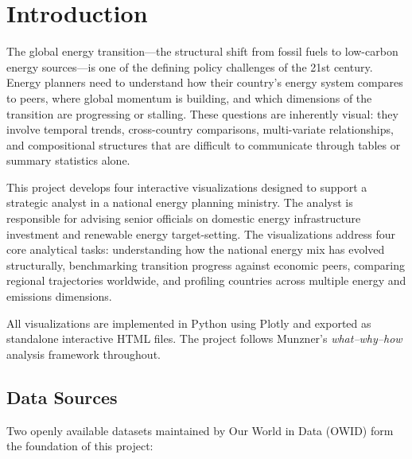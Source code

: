 \documentclass[10pt]{article}
\begin{document}
\section{Introduction}
\label{sec:intro}

The global energy transition---the structural shift from fossil fuels to low-carbon energy sources---is one of the defining policy challenges of the 21st century. Energy planners need to understand how their country's energy system compares to peers, where global momentum is building, and which dimensions of the transition are progressing or stalling. These questions are inherently visual: they involve temporal trends, cross-country comparisons, multi-variate relationships, and compositional structures that are difficult to communicate through tables or summary statistics alone.

This project develops four interactive visualizations designed to support a strategic analyst in a national energy planning ministry. The analyst is responsible for advising senior officials on domestic energy infrastructure investment and renewable energy target-setting. The visualizations address four core analytical tasks: understanding how the national energy mix has evolved structurally, benchmarking transition progress against economic peers, comparing regional trajectories worldwide, and profiling countries across multiple energy and emissions dimensions.

All visualizations are implemented in Python using Plotly and exported as standalone interactive HTML files. The project follows Munzner's \emph{what--why--how} analysis framework throughout.

\subsection{Data Sources}

Two openly available datasets maintained by Our World in Data (OWID) form the foundation of this project:
\end{document}
